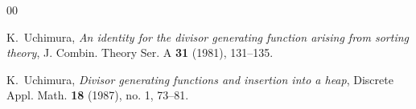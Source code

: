 \documentclass[11pt,reqno]{amsart}
\renewcommand{\(}{\left\(}
\renewcommand{\)}{\right\)}
\renewcommand{\[}{\left\[}
\renewcommand{\]}{\right\]}
\numberwithin{equation}{section}
\theoremstyle{plain}
\begin{document}
\begin{thebibliography}{00}
 
 K.~Uchimura, \emph{An identity for the divisor generating function arising from sorting theory}, J. Combin.
 Theory Ser. A {\bf 31} (1981), 131--135. 
 
 K.~Uchimura,  \emph{Divisor generating functions and insertion into a heap},  Discrete Appl. Math.  {\bf 18} (1987),  no. 1, 73--81.   
 
 
 
 
 \end{thebibliography}
\end{document}

